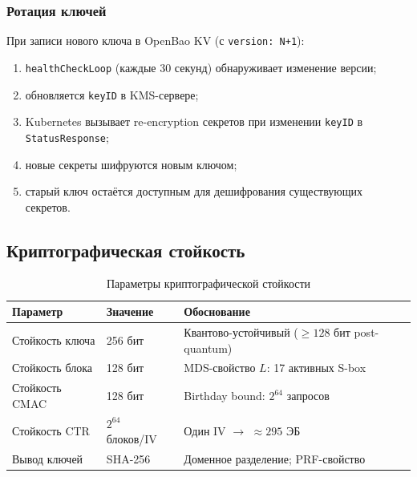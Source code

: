 \documentclass[a4paper,14pt]{extarticle}
\begin{document}
\subsubsection{Ротация ключей}

При записи нового ключа в OpenBao KV (с \texttt{version: N+1}):
\begin{enumerate}
    \item \texttt{healthCheckLoop} (каждые 30 секунд) обнаруживает изменение версии;
    \item обновляется \texttt{keyID} в KMS-сервере;
    \item Kubernetes вызывает re-encryption секретов при изменении \texttt{keyID} в \texttt{StatusResponse};
    \item новые секреты шифруются новым ключом;
    \item старый ключ остаётся доступным для дешифрования существующих секретов.
\end{enumerate}

\subsection{Криптографическая стойкость}

\begin{table}[h]
\centering
\caption{Параметры криптографической стойкости}
\begin{tabular}{@{}llp{7cm}@{}}
\toprule
\textbf{Параметр} & \textbf{Значение} & \textbf{Обоснование} \\
\midrule
Стойкость ключа & 256 бит & Квантово-устойчивый ($\geq 128$ бит post-quantum) \\
Стойкость блока & 128 бит & MDS-свойство $L$: 17 активных S-box \\
Стойкость CMAC & 128 бит & Birthday bound: $2^{64}$ запросов \\
Стойкость CTR & $2^{64}$ блоков/IV & Один IV $\to$ $\approx 295$ ЭБ \\
Вывод ключей & SHA-256 & Доменное разделение; PRF-свойство \\
\bottomrule
\end{tabular}
\end{table}
\end{document}
